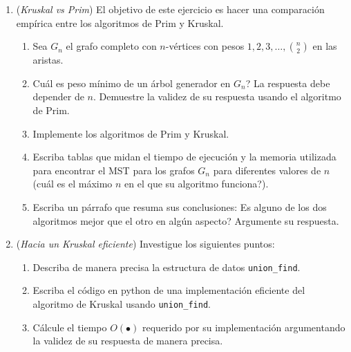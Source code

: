 \documentclass[12pt, a4paper]{article}
\begin{document}
\begin{enumerate}
\item ({\it Kruskal vs Prim}) El objetivo de este ejercicio es hacer una comparación empírica entre los algoritmos de Prim y Kruskal. 
\begin{enumerate}
\item Sea $G_n$ el grafo completo con $n$-vértices con pesos $1,2,3,\dots, \binom{n}{2}$ en las aristas.
\item Cuál es peso mínimo de un árbol generador en $G_n$? La respuesta debe depender de $n$. Demuestre la validez de su respuesta usando el algoritmo de Prim.
\item Implemente los algoritmos de Prim y Kruskal.
\item Escriba tablas que midan el tiempo de ejecución y la memoria utilizada para encontrar el MST para los grafos $G_n$ para diferentes valores de $n$ (cuál es el máximo $n$ en el que su algoritmo funciona?).
\item Escriba un párrafo que resuma sus conclusiones: Es alguno de los dos algoritmos mejor que el otro en algún aspecto? Argumente su respuesta.
\end{enumerate}

\item ({\it Hacia un Kruskal eficiente}) Investigue los siguientes puntos:
\begin{enumerate}
\item Describa de manera precisa la estructura de datos \verb!union_find!.
\item Escriba el código en python de una implementación eficiente del algoritmo de Kruskal usando \verb!union_find!.
\item Cálcule el tiempo $O(\bullet)$ requerido por su implementación argumentando la validez de su respuesta de manera precisa.
\end{enumerate}


\end{enumerate}
\end{document}
